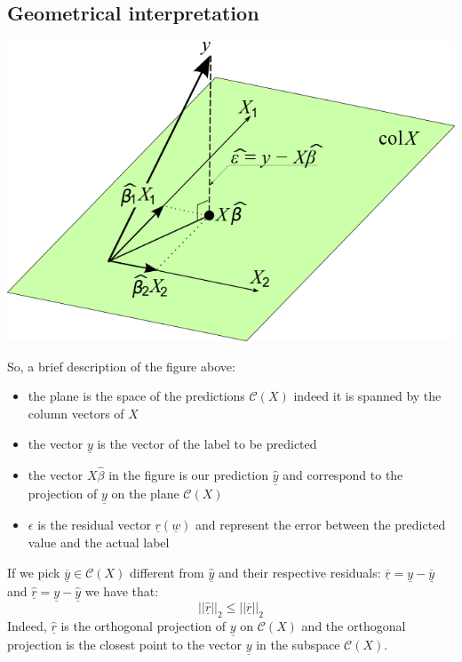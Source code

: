 \subsection{Geometrical interpretation}
\begin{center}
    \includegraphics[scale = 0.4]{../images/OLS_geometric_interpretation.png}
\end{center}
So, a brief description of the figure above:
\begin{itemize}
    \item the plane is the space of the predictions $\mathcal{C}(X)$ indeed it is spanned by the column vectors of $X$ 
    \item the vector $\underline{y}$ is the vector of the label to be predicted
    \item the vector $X\hat{\beta}$ in the figure is our prediction $\hat{\underline{y}}$ and correspond to the projection of $\underline{y}$ on the plane $\mathcal{C}(X)$
    \item $\epsilon$ is the residual vector $\underline{r}(\underline{w})$ and represent the error between the predicted value and the actual label
\end{itemize}
If we pick $\underline{\overline{y}} \in \mathcal{C}(X)$ different from $\hat{\underline{y}}$ and their respective residuals: $\underline{\overline{r}} = \underline{y} - \underline{\overline{y}}$ and $\underline{\hat{r}} = \underline{y} - \underline{\hat{y}}$ we have that:
\[
    ||\underline{\hat{r}}||_2 \leq ||\underline{\overline{r}}||_2
\]
Indeed, $\underline{\hat{r}}$ is the orthogonal projection of $\underline{y}$ on $\mathcal{C}(X)$ and the orthogonal projection is the closest point to the vector $\underline{y}$ in the subspace $\mathcal{C}(X)$.\\
